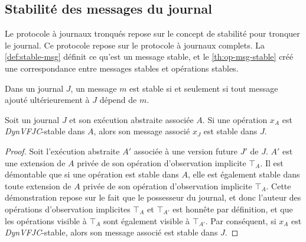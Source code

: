 

\subsection{Stabilité des messages du journal}\label{subsec:msg-stable}

Le protocole à journaux tronqués repose sur le concept de stabilité pour tronquer le journal.
Ce protocole repose sur le protocole à journaux complets.
La \autoref{def:stable-msg} définit ce qu'est un message stable, et le \autoref{th:op-msg-stable} créé une correspondance entre messages stables et opérations stables.

\begin{definition}\label{def:stable-msg}
Dans un journal $J$, un message $m$ est stable si et seulement si tout message ajouté ultérieurement à $J$ dépend de $m$.
\end{definition}

\begin{theorem}\label{th:op-msg-stable}
Soit un journal $J$ et son exécution abstraite associée $A$.
Si une opération $x_A$ est \emph{DynVFJC}-stable dans $A$, alors son message associé $x_J$ est stable dans $J$.
\end{theorem}

\begin{proof}
Soit l'exécution abstraite $A'$ associée à une version future $J'$ de $J$.
$A'$ est une extension de $A$ privée de son opération d'observation implicite $\top_A$.
Il est démontable que si une opération est stable dans $A$, elle est également stable dans toute extension de $A$ privée de son opération d'observation implicite $\top_A$.
Cette démonstration repose sur le fait que le possesseur du journal, et donc l'auteur des opérations d'observation implicites $\top_A$ et $\top_{A'}$ est honnête par définition, et que les opérations visible à $\top_A$ sont également visible à $\top_{A'}$.
Par conséquent, si $x_A$ est \emph{DynVFJC}-stable, alors son message associé est stable dans $J$.
\end{proof}


